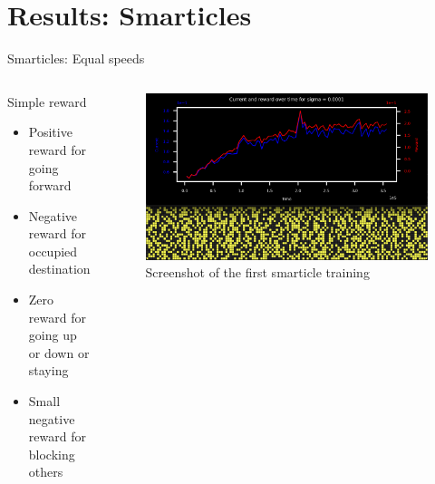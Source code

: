 \documentclass[10pt,xcolor=table, aspectratio=1610]{beamer}
\begin{document}
\section[Smarticles]{Results: Smarticles}
\begin{frame}{Smarticles: Equal speeds}
  \begin{columns}
    \begin{block}{Simple reward}
      \begin{itemize}
        \item Positive reward for going forward
        \item Negative reward for occupied destination
        \item Zero reward for going up or down or staying
        \item Small negative reward for blocking others
      \end{itemize}
    \end{block}

      \begin{figure}
        \includegraphics[width=\textwidth]{../Thesis/img/results/first_training_screenshot.png}
        \caption*{Screenshot of the first smarticle training}
      \end{figure}
      
  \end{columns}

\end{frame}
\end{document}
